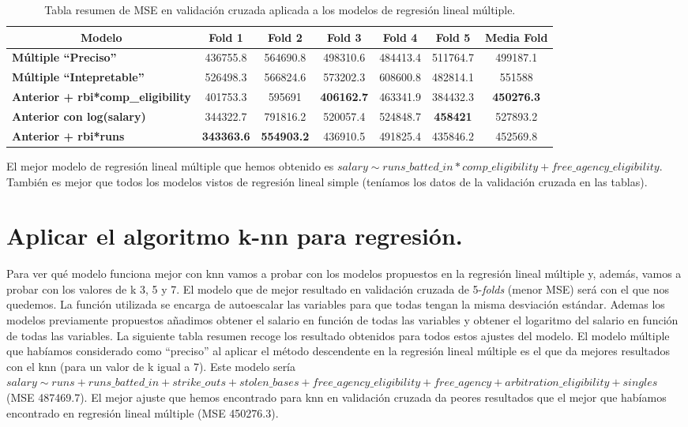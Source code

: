 \documentclass[a4paper,12pt, oneside]{book}
\begin{document}
\begin{table}[H]
\centering
\footnotesize
\begin{tabular}{@{}lcccccc@{}}
\toprule
\multicolumn{1}{c}{\textbf{Modelo}} & \textbf{Fold 1} & \textbf{Fold 2} & \textbf{Fold 3} & \textbf{Fold 4} & \textbf{Fold 5} & \textbf{Media Fold} \\ \midrule
\textbf{Múltiple ``Preciso''} & 436755.8 & 564690.8 & 498310.6 & 484413.4 & 511764.7 & 499187.1 \\
\textbf{Múltiple ``Intepretable''} & 526498.3 & 566824.6 & 573202.3 & 608600.8 & 482814.1 & 551588 \\
\textbf{Anterior + rbi*comp\_eligibility} & 401753.3 & 595691 & \textbf{406162.7} & 463341.9 & 384432.3 & \textbf{450276.3} \\
\textbf{Anterior con log(salary)} & 344322.7 & 791816.2 & 520057.4 & 524848.7 & \textbf{458421} & 527893.2 \\
\textbf{Anterior + rbi*runs} & \textbf{343363.6} & \textbf{554903.2} & 436910.5 & 491825.4 & 435846.2 & 452569.8 \\ \bottomrule
\end{tabular}
\caption{Tabla resumen de MSE en validación cruzada aplicada a los modelos de regresión lineal múltiple.}
\label{tab:msemultireg}
\end{table}

El mejor modelo de regresión lineal múltiple que hemos obtenido es $salary \sim runs\_batted\_in*comp\_eligibility+free\_agency\_eligibility$. También es mejor que todos los modelos vistos de regresión lineal simple (teníamos los datos de la validación cruzada en las tablas).







\section[k-nn para regresión]{Aplicar el algoritmo k-nn para regresión.}
Para ver qué modelo funciona mejor con knn vamos a probar con los modelos propuestos en la regresión lineal múltiple y, además, vamos a probar con los valores de k 3, 5 y 7. El modelo que de mejor resultado en validación cruzada de 5-\textit{folds} (menor MSE) será con el que nos quedemos. La función utilizada se encarga de autoescalar las variables para que todas tengan la misma desviación estándar. Ademas los modelos previamente propuestos añadimos obtener el salario en función de todas las variables y obtener el logaritmo del salario en función de todas las variables. La siguiente tabla resumen recoge los resultado obtenidos para todos estos ajustes del modelo. El modelo múltiple que habíamos considerado como ``preciso'' al aplicar el método descendente en la regresión lineal múltiple es el que da mejores resultados con el knn (para un valor de k igual a 7). Este modelo sería $salary \sim runs + runs\_batted\_in + strike\_outs + stolen\_bases + free\_agency\_eligibility + free\_agency + arbitration\_eligibility + singles$ (MSE 487469.7). El mejor ajuste que hemos encontrado para knn en validación cruzada da peores resultados que el mejor que habíamos encontrado en regresión lineal múltiple (MSE 450276.3).
\end{document}
